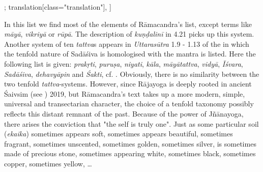 \begin{alignment}[
  texts=edition[class="edition"];
  translation[class="translation"],
  ]
\begin{translation}
\begin{tlate}
{              In this list we find most of the elements of Rāmacandra's list, except terms like \textit{māyā}, \textit{vikriyā} or \textit{rūpā}. The description of \textit{kuṇḍalinī} in  4.21 picks up this system. Another system of ten \textit{tattva}s appears in \textit{Uttarasūtra} 1.9 - 1.13 of the  in which the tenfold nature of Sadāśiva is homologised with the mantra is listed. Here the following list is given: \textit{prakṛti}, \textit{puruṣa}, \textit{niyati}, \textit{kāla}, \textit{māyātattva}, \textit{vidyā}, \textit{Īśvara}, \textit{Sadāśiva}, \textit{dehavyāpin} and \textit{Śakti}, cf. \citeauthor[2016: 83-84]{goodall2016}. Obviously, there is no similarity between the two tenfold \textit{tattva}-systems. However, since Rājayoga is deeply rooted in ancient Śaivsim (see \citeauthor{birch2019saiva}) 2019, but Rāmacandra's text takes up a more modern, simple, universal and transectarian character, the choice of a tenfold taxonomy possibly reflects this distant remnant of the past.}\textsuperscript{\coro{[\lowroman{5}]}} Because of the power of Jñānayoga, there arises the conviction that "the self is truly one". Just as some particular soil (\textit{ekaika}) sometimes appears soft, sometimes appears beautiful, sometimes fragrant, sometimes unscented, sometimes golden, sometimes silver, is sometimes made of precious stone, sometimes appearing white, sometimes black, sometimes copper, sometimes yellow, \ldots
            \end{tlate}
  \end{translation}
\end{alignment}
\ekdpb*{}
